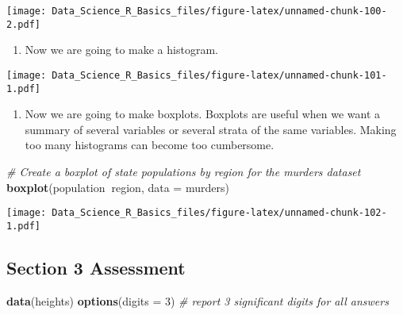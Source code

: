 \documentclass[]{article}
\newenvironment{Shaded}{\begin{snugshade}}{\end{snugshade}}
\newcommand{\CommentTok}[1]{\textcolor[rgb]{0.56,0.35,0.01}{\textit{#1}}}
\newcommand{\DataTypeTok}[1]{\textcolor[rgb]{0.13,0.29,0.53}{#1}}
\newcommand{\DecValTok}[1]{\textcolor[rgb]{0.00,0.00,0.81}{#1}}
\newcommand{\KeywordTok}[1]{\textcolor[rgb]{0.13,0.29,0.53}{\textbf{#1}}}
\newcommand{\NormalTok}[1]{#1}
\newcommand{\OperatorTok}[1]{\textcolor[rgb]{0.81,0.36,0.00}{\textbf{#1}}}
\newcommand{\StringTok}[1]{\textcolor[rgb]{0.31,0.60,0.02}{#1}}
\providecommand{\tightlist}{%
  \setlength{\itemsep}{0pt}\setlength{\parskip}{0pt}}
\begin{document}
\texttt{[image: Data\_Science\_R\_Basics\_files/figure-latex/unnamed-chunk-100-2.pdf]}

\begin{enumerate}
\def\labelenumi{\arabic{enumi}.}
\setcounter{enumi}{1}
\tightlist
\item
  Now we are going to make a histogram.
\end{enumerate}

\begin{Shaded}
\end{Shaded}

\texttt{[image: Data\_Science\_R\_Basics\_files/figure-latex/unnamed-chunk-101-1.pdf]}

\begin{enumerate}
\def\labelenumi{\arabic{enumi}.}
\setcounter{enumi}{2}
\tightlist
\item
  Now we are going to make boxplots. Boxplots are useful when we want a
  summary of several variables or several strata of the same variables.
  Making too many histograms can become too cumbersome.
\end{enumerate}

\begin{Shaded}
\begin{Highlighting}[]
\CommentTok{# Create a boxplot of state populations by region for the murders dataset}
\KeywordTok{boxplot}\NormalTok{(population}\OperatorTok{~}\NormalTok{region, }\DataTypeTok{data =}\NormalTok{ murders)}
\end{Highlighting}
\end{Shaded}

\texttt{[image: Data\_Science\_R\_Basics\_files/figure-latex/unnamed-chunk-102-1.pdf]}

\hypertarget{section-3-assessment}{%
\subsection{Section 3 Assessment}\label{section-3-assessment}}

\begin{Shaded}
\begin{Highlighting}[]
\KeywordTok{data}\NormalTok{(heights)}
\KeywordTok{options}\NormalTok{(}\DataTypeTok{digits =} \DecValTok{3}\NormalTok{)    }\CommentTok{# report 3 significant digits for all answers}
\end{Highlighting}
\end{Shaded}
\end{document}
